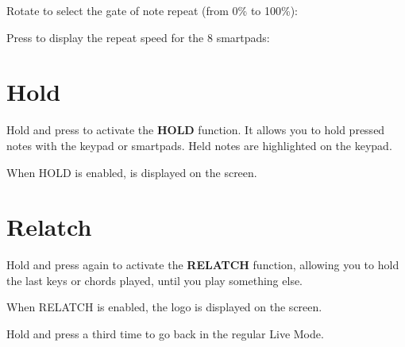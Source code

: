 
Rotate \encodericon{} to select the gate of note repeat (from 0\% to 100\%):


Press  to display the repeat speed for the 8 smartpads:



\section{Hold}

Hold  and press \playicon{} to activate the \textbf{HOLD} function. It allows you to hold pressed notes with the keypad or smartpads. Held notes are highlighted on the keypad.


When HOLD is enabled, \holdicon{} is displayed on the screen.


\section{Relatch}

Hold  and press again \playicon{} to activate the \textbf{RELATCH} function, allowing you to hold the last keys or chords played, until you play something else.

When RELATCH is enabled, the logo \relatchicon{} is displayed on the screen.

Hold  and press a third time \playicon{} to go back in the regular Live Mode.
